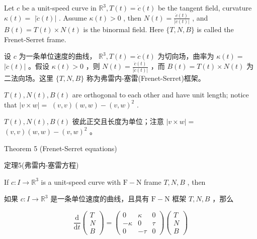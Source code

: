 Let \(c\) be a unit-speed curve in \({\mathbb{R}}^{3},T\left( t\right)  = \dot{c}\left( t\right)\) be the tangent field, curvature \(\kappa \left( t\right)  =\)  \(\left| {\ddot{c}\left( t\right) }\right|\) . Assume \(\kappa \left( t\right)  > 0\) , then \(N\left( t\right)  = \frac{\ddot{c}\left( t\right) }{\left| \ddot{c}\left( t\right) \right| }\) , and \(B\left( t\right)  = T\left( t\right)  \times  N\left( t\right)\) is the binormal field. Here \(\{ T,N,B\}\) is called the Frenet-Serret frame.

\begin{tcolorbox}
设 \(c\) 为一条单位速度的曲线， \({\mathbb{R}}^{3},T\left( t\right)  = \dot{c}\left( t\right)\) 为切向场，曲率为 \(\kappa \left( t\right)  =\)  \(\left| {\ddot{c}\left( t\right) }\right|\) 。假设 \(\kappa \left( t\right)  > 0\) ，则 \(N\left( t\right)  = \frac{\ddot{c}\left( t\right) }{\left| \ddot{c}\left( t\right) \right| }\) ，而 \(B\left( t\right)  = T\left( t\right)  \times  N\left( t\right)\) 为二法向场。这里 \(\{ T,N,B\}\) 称为弗雷内-塞雷(Frenet-Serret)框架。
\end{tcolorbox}

\(T\left( t\right) ,N\left( t\right) ,B\left( t\right)\) are orthogonal to each other and have unit length; notice that \(\left| {v \times  w}\right|  =\)  \(\left( {v,v}\right) \left( {w,w}\right)  - {\left( v,w\right) }^{2}\) .

\begin{tcolorbox}
\(T\left( t\right) ,N\left( t\right) ,B\left( t\right)\) 彼此正交且长度为单位；注意 \(\left| {v \times  w}\right|  =\)  \(\left( {v,v}\right) \left( {w,w}\right)  - {\left( v,w\right) }^{2}\) 。
\end{tcolorbox}

\HRule

Theorem 5 (Frenet-Serret equations)

\begin{tcolorbox}
定理5(弗雷内-塞雷方程)
\end{tcolorbox}

\HRule

If \(c : I \rightarrow  {\mathbb{R}}^{3}\) is a unit-speed curve with \(\mathrm{F} - \mathrm{N}\) frame \(T,N,B\) , then

\begin{tcolorbox}
如果 \(c : I \rightarrow  {\mathbb{R}}^{3}\) 是一条单位速度的曲线，且具有 \(\mathrm{F} - \mathrm{N}\) 框架 \(T,N,B\) ，那么
\end{tcolorbox}

\[
\frac{\mathrm{d}}{\mathrm{d}t}\left( \begin{array}{l} T \\  N \\  B \end{array}\right)  = \left( \begin{matrix} 0 & \kappa & 0 \\   - \kappa & 0 & \tau \\  0 &  - \tau & 0 \end{matrix}\right) \left( \begin{array}{l} T \\  N \\  B \end{array}\right)  \tag{4.1}
\]

